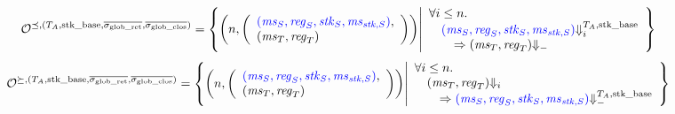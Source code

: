 \documentclass[a4paper]{article}
\begin{document}
\[
  \lrol = \left\{ \npair{\left(\array{l}\src{(\ms_S,\reg_S,\stk_S,\ms_{\stk,S})},\\(\ms_T,\reg_T)\endarray\right)} \middle|
    \begin{array}{l}
      \forall i \leq n \ldotp \\
      \quad \src{(\ms_S,\reg_S,\stk_S,\ms_{\stk,S})} \sterm[i]{\ta,\stkb} \\\qquad\Rightarrow (\ms_T,\reg_T) \term\\
    \end{array}
\right\}
\]
\[
  \lror = \left\{ \npair{\left(\array{l}\src{(\ms_S,\reg_S,\stk_S,\ms_{\stk,S})},\\(\ms_T,\reg_T)\endarray\right)} \middle|
    \begin{array}{l}
      \forall i \leq n \ldotp \\ 
      \quad (\ms_T ,\reg_T) \term[i] \\\qquad\Rightarrow \src{(\ms_S,\reg_S,\stk_S,\ms_{\stk,S})} \sterm{\ta,\stkb}
    \end{array}
\right\}
\]


\end{document}
